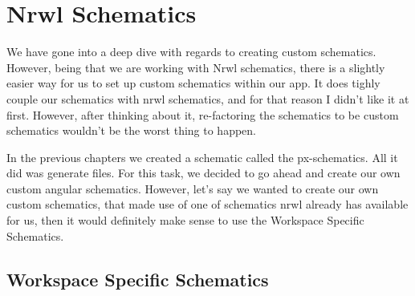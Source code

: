 \maketitle{}
\section{ Nrwl Schematics }

We have gone into a deep dive with regards to creating custom schematics.
However, being that we are working with Nrwl schematics, there is a slightly
easier way for us to set up custom schematics within our app. It does tighly
couple our schematics with nrwl schematics, and for that reason I didn't like
it at first. However, after thinking about it, re-factoring the schematics to
be custom schematics wouldn't be the worst thing to happen.

In the previous chapters we created a schematic called the px-schematics. All it
did was generate files. For this task, we decided to go ahead and create our own
custom angular schematics. However, let's say we wanted to create our own
custom schematics, that made use of one of schematics nrwl already has available
for us, then it would definitely make sense to use the Workspace Specific
Schematics.

\subsection{ Workspace Specific Schematics }
